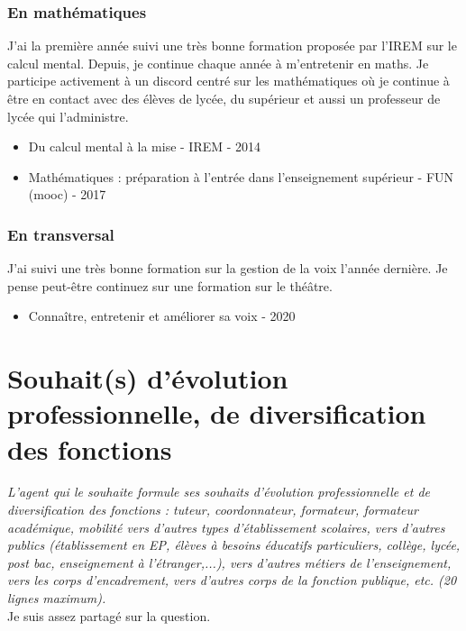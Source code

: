 \documentclass[11pt]{article}
\begin{document}
\subsubsection{En mathématiques}

J'ai la première année suivi une très bonne formation proposée par l'IREM sur le calcul mental. Depuis, je continue chaque année à m'entretenir en maths. Je participe activement à un discord centré sur les  mathématiques où je continue à être en contact avec des élèves de lycée, du supérieur et aussi un professeur de lycée qui l'administre. 

\begin{itemize}
  \item Du calcul mental à la mise - IREM - 2014
  \item Mathématiques : préparation à l'entrée dans l'enseignement supérieur - FUN (mooc) - 2017
\end{itemize}

\subsubsection{En transversal}

J'ai suivi une très bonne formation sur la gestion de la voix l'année dernière. Je pense peut-être continuez sur une formation sur le théâtre. 

\begin{itemize}
  \item Connaître, entretenir et améliorer sa voix - 2020
\end{itemize}

\newpage

\section{Souhait(s) d’évolution professionnelle, de diversification des fonctions}

\textit{L’agent qui le souhaite formule ses souhaits d’évolution professionnelle et de diversification des fonctions : tuteur, coordonnateur, formateur, formateur académique, mobilité vers d’autres types d’établissement scolaires, vers d’autres publics (établissement en EP, élèves à besoins éducatifs particuliers, collège, lycée, post bac, enseignement à l’étranger,...), vers d’autres métiers de l’enseignement, vers les corps d’encadrement, vers d’autres corps de la fonction publique, etc. (20 lignes maximum).}\\

 Je suis assez partagé sur la question. \\
\end{document}
